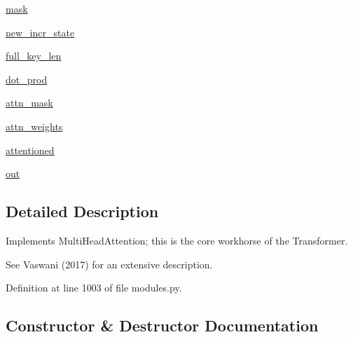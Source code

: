 \begin{DoxyCompactItemize}
\item 
\hyperlink{classparlai_1_1agents_1_1transformer_1_1modules_1_1MultiHeadAttention_a5fa22233ceed27025626b6c58701f085}{mask}
\item 
\hyperlink{classparlai_1_1agents_1_1transformer_1_1modules_1_1MultiHeadAttention_adb13ded9cb633bbe63d92dda6ab81e2a}{new\+\_\+incr\+\_\+state}
\item 
\hyperlink{classparlai_1_1agents_1_1transformer_1_1modules_1_1MultiHeadAttention_a8ef7af8f97df73fe6cd5fae6969e68bb}{full\+\_\+key\+\_\+len}
\item 
\hyperlink{classparlai_1_1agents_1_1transformer_1_1modules_1_1MultiHeadAttention_a34fb7def27abc78d179c7d944d67c305}{dot\+\_\+prod}
\item 
\hyperlink{classparlai_1_1agents_1_1transformer_1_1modules_1_1MultiHeadAttention_a733f712c97d7aa9b8bd8b7fd28d3adfe}{attn\+\_\+mask}
\item 
\hyperlink{classparlai_1_1agents_1_1transformer_1_1modules_1_1MultiHeadAttention_aef08475b7756f4c8e5049b3b17378a82}{attn\+\_\+weights}
\item 
\hyperlink{classparlai_1_1agents_1_1transformer_1_1modules_1_1MultiHeadAttention_a59719fa112c890e082ef22280fe13cc4}{attentioned}
\item 
\hyperlink{classparlai_1_1agents_1_1transformer_1_1modules_1_1MultiHeadAttention_a5c4a6c579fe84cd7fc04456359d334ac}{out}
\end{DoxyCompactItemize}


\subsection{Detailed Description}
\begin{DoxyVerb}Implements MultiHeadAttention; this is the core workhorse of the Transformer.

See Vaswani (2017) for an extensive description.
\end{DoxyVerb}
 

Definition at line 1003 of file modules.\+py.



\subsection{Constructor \& Destructor Documentation}
\mbox{\label{classparlai_1_1agents_1_1transformer_1_1modules_1_1MultiHeadAttention_a427b8cfaac6d37141555616d9cee8b74}} 
